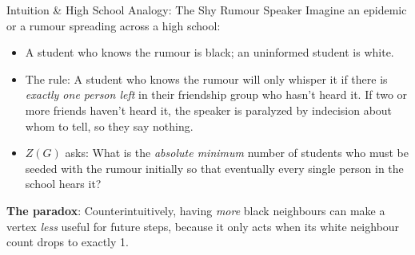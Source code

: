 \documentclass[11pt]{article}
\begin{document}
\begin{intubox}{Intuition \& High School Analogy: The Shy Rumour Speaker}
Imagine an epidemic or a rumour spreading across a high school:
\begin{itemize}[leftmargin=*,nosep]
  \item A student who knows the rumour is black; an uninformed student is white.
  \item The rule: A student who knows the rumour will only whisper it if there is \emph{exactly one person left} in their friendship group who hasn't heard it. If two or more friends haven't heard it, the speaker is paralyzed by indecision about whom to tell, so they say nothing.
  \item $Z(G)$ asks: What is the \emph{absolute minimum} number of students who must be seeded with the rumour initially so that eventually every single person in the school hears it?
\end{itemize}
\textbf{The paradox}: Counterintuitively, having \emph{more} black neighbours can make a vertex \emph{less} useful for future steps, because it only acts when its white neighbour count drops to exactly 1.
\end{intubox}
\end{document}
